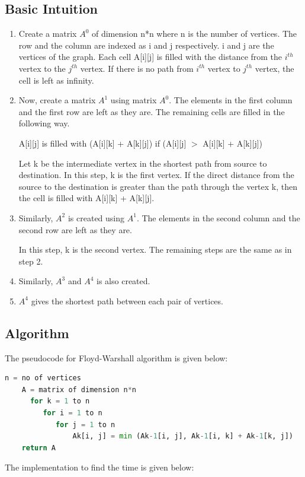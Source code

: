 \documentclass[a4paper, 12pt]{report}
\begin{document}
	\subsection{Basic Intuition}
	\begin{enumerate}
	    \item Create a matrix $A^{0}$ of dimension n*n where n is the number of vertices. The row and the column are indexed as i and j respectively. i and j are the vertices of the graph. Each cell A[i][j] is filled with the distance from the $i^{th}$ vertex to the $j^{th}$ vertex. If there is no path from $i^{th}$ vertex to $j^{th}$ vertex, the cell is left as infinity.
	    \item Now, create a matrix $A^{1}$ using matrix $A^{0}$. The elements in the first column and the first row are left as they are. The remaining cells are filled in the following way.
	    
	    A[i][j] is filled with (A[i][k] + A[k][j]) if (A[i][j] $>$ A[i][k] + A[k][j])
	    
	    Let k be the intermediate vertex in the shortest path from source to destination. In this step, k is the first vertex. If the direct distance from the source to the destination is greater than the path through the vertex k, then the cell is filled with A[i][k] + A[k][j].
	    \item Similarly, $A^{2}$ is created using $A^{1}$. The elements in the second column and the second row are left as they are.
	    
	    In this step, k is the second vertex. The remaining steps are the same as in step 2.
	    \item Similarly, $A^{3}$ and $A^{4}$ is also created.
	    \item $A^{4}$ gives the shortest path between each pair of vertices.

	\end{enumerate}
	
	\subsection{Algorithm}
	The pseudocode for Floyd-Warshall algorithm is given below: 
	\begin{lstlisting}[language=Python]
    n = no of vertices
    A = matrix of dimension n*n
      for k = 1 to n
         for i = 1 to n
            for j = 1 to n
                Ak[i, j] = min (Ak-1[i, j], Ak-1[i, k] + Ak-1[k, j])
    return A
    \end{lstlisting}
The implementation to find the time is given below:

\end{document}
